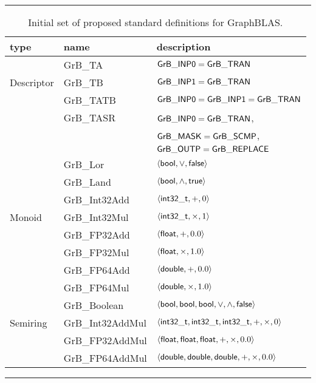 \begin{table}[htb]
	\hrule
	\caption{Initial set of proposed standard definitions for GraphBLAS.}
	\label{Tab:stddef}
	\begin{center}
	\begin{tabular}{|l|l|l|} \hline
		type		& name				& description \\ \hline
				& {\sf GrB\_TA}			& ${\sf GrB\_INP0} = {\sf GrB\_TRAN}$ \\
		Descriptor	& {\sf GrB\_TB}			& ${\sf GrB\_INP1} = {\sf GrB\_TRAN}$ \\ 
				& {\sf GrB\_TATB}		& ${\sf GrB\_INP0} = {\sf GrB\_INP1} = {\sf GrB\_TRAN}$ \\
				& {\sf GrB\_TASR}		& ${\sf GrB\_INP0} = {\sf GrB\_TRAN}$, \\
				&				& ${\sf GrB\_MASK} = {\sf GrB\_SCMP}$, \\
				&				& ${\sf GrB\_OUTP} = {\sf GrB\_REPLACE}$ \\ \hline
				& {\sf GrB\_Lor}		& $\left\langle {\sf bool}, \vee, {\sf false} \right\rangle$ \\
				& {\sf GrB\_Land}		& $\left\langle {\sf bool}, \wedge, {\sf true} \right\rangle$ \\
				& {\sf GrB\_Int32Add}		& $\left\langle {\sf int32\_t}, +, 0 \right\rangle$ \\
		Monoid		& {\sf GrB\_Int32Mul}		& $\left\langle {\sf int32\_t}, \times, 1 \right\rangle$ \\
				& {\sf GrB\_FP32Add}		& $\left\langle {\sf float}, +, 0.0 \right\rangle$ \\
				& {\sf GrB\_FP32Mul}		& $\left\langle {\sf float}, \times, 1.0 \right\rangle$ \\
				& {\sf GrB\_FP64Add}		& $\left\langle {\sf double}, +, 0.0 \right\rangle$ \\ 
				& {\sf GrB\_FP64Mul}		& $\left\langle {\sf double}, \times, 1.0 \right\rangle$ \\ \hline
				& {\sf GrB\_Boolean}		& $\left\langle {\sf bool}, {\sf bool}, {\sf bool}, \vee, \wedge, {\sf false} \right\rangle$ \\
		Semiring	& {\sf GrB\_Int32AddMul}	& $\left\langle {\sf int32\_t}, {\sf int32\_t}, {\sf int32\_t}, +, \times, 0 \right\rangle$ \\
				& {\sf GrB\_FP32AddMul}		& $\left\langle {\sf float}, {\sf float}, {\sf float}, +, \times, 0.0 \right\rangle$ \\ 
				& {\sf GrB\_FP64AddMul}		& $\left\langle {\sf double}, {\sf double}, {\sf double}, +, \times, 0.0 \right\rangle$ \\ \hline
	\end{tabular}
	\end{center}
	\hrule
\end{table}
